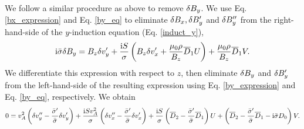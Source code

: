 We follow a similar procedure as above to remove $\delta B_y$. 
We use Eq. \ref{bx_expression} and Eq. \ref{by_eq} to 
eliminate $\delta B_x,\delta B_y^\prime$ and $\delta B_y^{\prime\prime}$ from the
right-hand-side of the $y$-induction equation (Eq. \ref{induct_y}), 
\begin{align}
  \mathrm{i}\bar{\sigma}\delta B_y = B_z\delta v_y^\prime + \frac{\mathrm{i} S}{\sigma}\left(
    B_z\delta v_x^\prime + \frac{\mu_0\rho}{B_z}\overline{D}_1U\right) +
  \frac{\mu_0\rho}{B_z}\overline{D}_1V. \label{by_expression}
\end{align}
We differentiate this expression with respect to $z$, then eliminate 
$\delta B_y$ and  $\delta B_y^\prime$ from the left-hand-side of the resulting
expression using Eq. \ref{by_expression} and 
Eq. \ref{by_eq}, respectively. We obtain
\begin{align}
0 = v_A^2\left(\dvy^{\prime\prime} -
\frac{\sbar^\prime}{\sbar}\dvy^\prime\right)  
+ \frac{\imgi S v_A^2}{\sigma}\left(\dvx^{\prime\prime} -
\frac{\sbar^\prime}{\sbar}\dvx^\prime\right) + \frac{\imgi
  S}{\sigma}\left(\overline{D}_2 -
    \frac{\sbar^\prime}{\sbar}\overline{D}_1 \right)U 
+\left(\overline{D}_2 -
    \frac{\sbar^\prime}{\sbar}\overline{D}_1 - \imgi\sbar D_0 \right)V. \label{final_vy}
%
\end{align}

